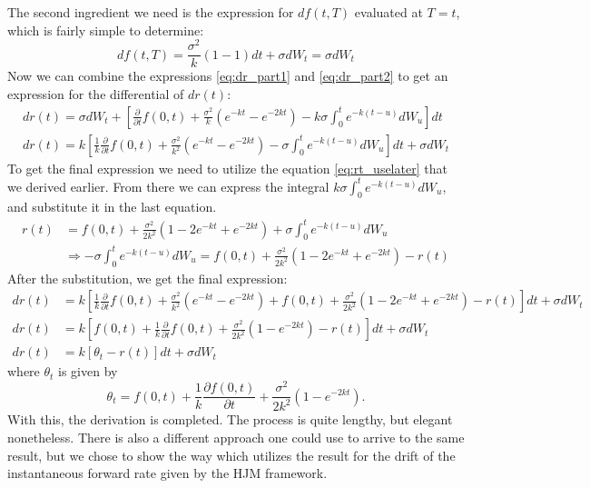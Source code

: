 \documentclass[titlepage, 12pt]{article}
\begin{document}
	The second ingredient we need is the expression for $df(t,T)$ evaluated at $T=t$, which is fairly simple to determine:
	\begin{equation}\label{eq:dr_part2}
		df(t,T) = \frac{\sigma^2}{k}(1-1) dt + \sigma dW_t = \sigma dW_t
	\end{equation}
	Now we can combine the expressions \eqref{eq:dr_part1} and \eqref{eq:dr_part2} to get an expression for the differential of $dr(t)$:
	\begin{equation}
		\begin{split}
			dr(t) = \sigma dW_t + \left[ \frac{\partial}{\partial t}f(0,t) + \frac{\sigma^2}{k} \left( e^{-kt} - e^{-2kt} \right) - k\sigma \int_0^t e^{-k(t-u)} dW_u \right]dt \\
			dr(t) = k\left[\frac{1}{k}\frac{\partial}{\partial t}f(0,t) + \frac{\sigma^2}{k^2} \left( e^{-kt} - e^{-2kt} \right) - \sigma \int_0^t e^{-k(t-u)} dW_u \right]dt + \sigma dW_t
		\end{split}
	\end{equation}
	To get the final expression we need to utilize the equation \eqref{eq:rt_uselater} that we derived earlier. From there we can express the integral $k\sigma \int_0^t e^{-k(t-u)} dW_u$, and substitute it in the last equation.
	\begin{equation}
		\begin{split}
			r(t) &= f(0,t) + \frac{\sigma^2}{2k^2} \left( 1 - 2e^{-kt} + e^{-2kt} \right) + \sigma \int_0^t e^{-k(t-u)} dW_u \\
			&\Rightarrow -\sigma \int_0^t e^{-k(t-u)} dW_u = f(0,t) + \frac{\sigma^2}{2k^2} \left( 1 - 2e^{-kt} + e^{-2kt} \right) - r(t)
		\end{split}
	\end{equation}
	After the substitution, we get the final expression:
	\begin{equation}
		\begin{split}
			dr(t) &= k\left[\frac{1}{k}\frac{\partial}{\partial t}f(0,t) + \frac{\sigma^2}{k^2} \left( e^{-kt} - e^{-2kt} \right) + f(0,t) + \frac{\sigma^2}{2k^2} \left( 1 - 2e^{-kt} + e^{-2kt} \right) - r(t) \right]dt + \sigma dW_t \\
			dr(t) &= k\left[f(0,t) + \frac{1}{k}\frac{\partial}{\partial t}f(0,t) + \frac{\sigma^2}{2k^2} \left( 1-e^{-2kt} \right) - r(t) \right]dt + \sigma dW_t \\
			dr(t) &= k\left[\theta_t - r(t) \right]dt + \sigma dW_t 
		\end{split}
	\end{equation}
	where $\theta_t$ is given by
	\begin{equation}
		\theta_t = f(0,t) + \frac{1}{k}\frac{\partial f(0,t)}{\partial t} + \frac{\sigma^2}{2k^2} \left( 1-e^{-2kt} \right).	
	\end{equation}
	With this, the derivation is completed. The process is quite lengthy, but elegant nonetheless. There is also a different approach one could use to arrive to the same result, but we chose to show the way which utilizes the result for the drift of the instantaneous forward rate given by the HJM framework.
	
	\newpage
	\nocite{*}
	
	
	
\end{document}
